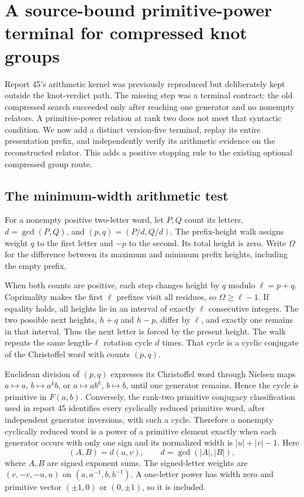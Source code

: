 \section{A source-bound primitive-power terminal for compressed knot groups}
\label{sec:primitive-power-terminal}

Report 45's arithmetic kernel was previously reproduced but deliberately
kept outside the knot-verdict path. The missing step was a terminal contract:
the old compressed search succeeded only after reaching one generator and
no nonempty relators. A primitive-power relation at rank two does not meet
that syntactic condition. We now add a distinct version-five terminal,
replay its entire presentation prefix, and independently verify its
arithmetic evidence on the reconstructed relator. This adds a positive
stopping rule to the existing optional compressed group route.

\subsection{The minimum-width arithmetic test}

For a nonempty positive two-letter word, let $P,Q$ count its letters,
$d=\gcd(P,Q)$, and $(p,q)=(P/d,Q/d)$. The prefix-height walk assigns
weight $q$ to the first letter and $-p$ to the second. Its total height is
zero. Write $\Omega$ for the difference between its maximum and minimum
prefix heights, including the empty prefix.

When both counts are positive, each step changes height by $q$ modulo
$\ell=p+q$. Coprimality makes the first $\ell$ prefixes visit all residues,
so $\Omega\ge\ell-1$. If equality holds, all heights lie in an interval
of exactly $\ell$ consecutive integers. The two possible next heights,
$h+q$ and $h-p$, differ by $\ell$, and exactly one remains in that interval.
Thus the next letter is forced by the present height. The walk repeats
the same length-$\ell$ rotation cycle $d$ times. That cycle is a cyclic
conjugate of the Christoffel word with counts $(p,q)$.

Euclidean division of $(p,q)$ expresses its Christoffel word through
Nielsen maps $a\mapsto a$, $b\mapsto a^k b$, or
$a\mapsto ab^k$, $b\mapsto b$, until one generator remains. Hence the
cycle is primitive in $F(a,b)$. Conversely, the rank-two primitive
conjugacy classification used in report 45 identifies every cyclically
reduced primitive word, after independent generator inversions, with
such a cycle. Therefore a nonempty cyclically reduced word is a power of
a primitive element exactly when each generator occurs with only one sign
and its normalized width is $|u|+|v|-1$. Here
\[
 (A,B)=d(u,v),\qquad d=\gcd(|A|,|B|),
\]
where $A,B$ are signed exponent sums. The signed-letter weights are
$(v,-v,-u,u)$ on $(a,a^{-1},b,b^{-1})$.
A one-letter power has width zero and primitive vector $(\pm1,0)$ or
$(0,\pm1)$, so it is included.

